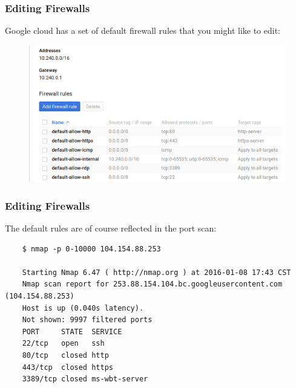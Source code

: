 \documentclass[9pt]{beamer}
\begin{document}
\begin{frame}[fragile]
  \frametitle{Editing Firewalls}
  Google cloud has a set of default firewall rules that you might like to edit:
  \begin{figure}
    \includegraphics[scale=0.2]{figures/DefaultFirewall.png}
  \end{figure}
\end{frame}

\begin{frame}[fragile]
  \frametitle{Editing Firewalls}
  The default rules are of course reflected in the port scan:
  \begin{verbatim}
    $ nmap -p 0-10000 104.154.88.253

    Starting Nmap 6.47 ( http://nmap.org ) at 2016-01-08 17:43 CST
    Nmap scan report for 253.88.154.104.bc.googleusercontent.com (104.154.88.253)
    Host is up (0.040s latency).
    Not shown: 9997 filtered ports
    PORT     STATE  SERVICE
    22/tcp   open   ssh
    80/tcp   closed http
    443/tcp  closed https
    3389/tcp closed ms-wbt-server
  \end{verbatim}
\end{frame}
\end{document}
